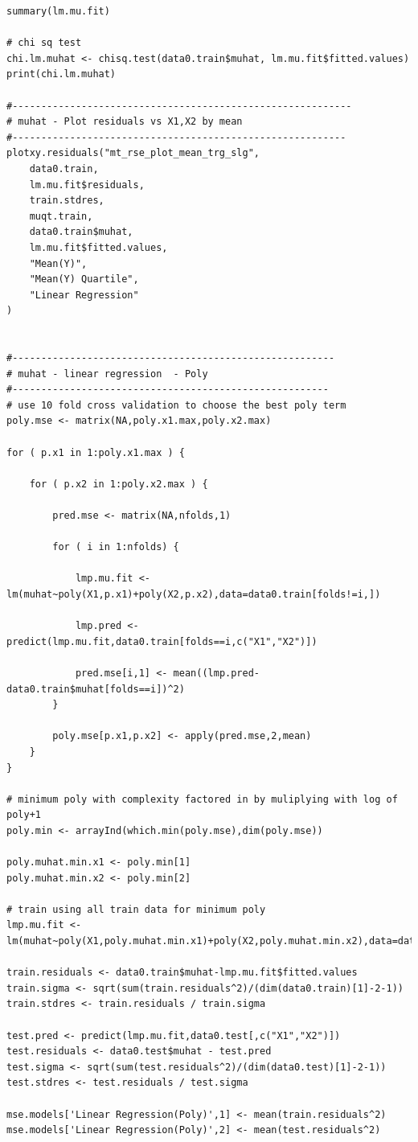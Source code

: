 \documentclass[twoside,12pt]{article}
\begin{document}
\begin{verbatim}
summary(lm.mu.fit)

# chi sq test
chi.lm.muhat <- chisq.test(data0.train$muhat, lm.mu.fit$fitted.values)
print(chi.lm.muhat)

#-----------------------------------------------------------
# muhat - Plot residuals vs X1,X2 by mean
#----------------------------------------------------------
plotxy.residuals("mt_rse_plot_mean_trg_slg",
	data0.train,
	lm.mu.fit$residuals,
	train.stdres,
	muqt.train,
	data0.train$muhat,
	lm.mu.fit$fitted.values,
	"Mean(Y)",
	"Mean(Y) Quartile",
	"Linear Regression"
)


#--------------------------------------------------------
# muhat - linear regression  - Poly
#-------------------------------------------------------
# use 10 fold cross validation to choose the best poly term
poly.mse <- matrix(NA,poly.x1.max,poly.x2.max)

for ( p.x1 in 1:poly.x1.max ) {

	for ( p.x2 in 1:poly.x2.max ) {

		pred.mse <- matrix(NA,nfolds,1)

		for ( i in 1:nfolds) {
	
			lmp.mu.fit <- lm(muhat~poly(X1,p.x1)+poly(X2,p.x2),data=data0.train[folds!=i,])
		
			lmp.pred <- predict(lmp.mu.fit,data0.train[folds==i,c("X1","X2")])

			pred.mse[i,1] <- mean((lmp.pred-data0.train$muhat[folds==i])^2)
		}

		poly.mse[p.x1,p.x2] <- apply(pred.mse,2,mean)
	}
}

# minimum poly with complexity factored in by muliplying with log of poly+1
poly.min <- arrayInd(which.min(poly.mse),dim(poly.mse))

poly.muhat.min.x1 <- poly.min[1]
poly.muhat.min.x2 <- poly.min[2]

# train using all train data for minimum poly
lmp.mu.fit <- lm(muhat~poly(X1,poly.muhat.min.x1)+poly(X2,poly.muhat.min.x2),data=data0.train)

train.residuals <- data0.train$muhat-lmp.mu.fit$fitted.values
train.sigma <- sqrt(sum(train.residuals^2)/(dim(data0.train)[1]-2-1))
train.stdres <- train.residuals / train.sigma

test.pred <- predict(lmp.mu.fit,data0.test[,c("X1","X2")])
test.residuals <- data0.test$muhat - test.pred
test.sigma <- sqrt(sum(test.residuals^2)/(dim(data0.test)[1]-2-1))
test.stdres <- test.residuals / test.sigma

mse.models['Linear Regression(Poly)',1] <- mean(train.residuals^2)
mse.models['Linear Regression(Poly)',2] <- mean(test.residuals^2)


\end{verbatim}
\end{document}
